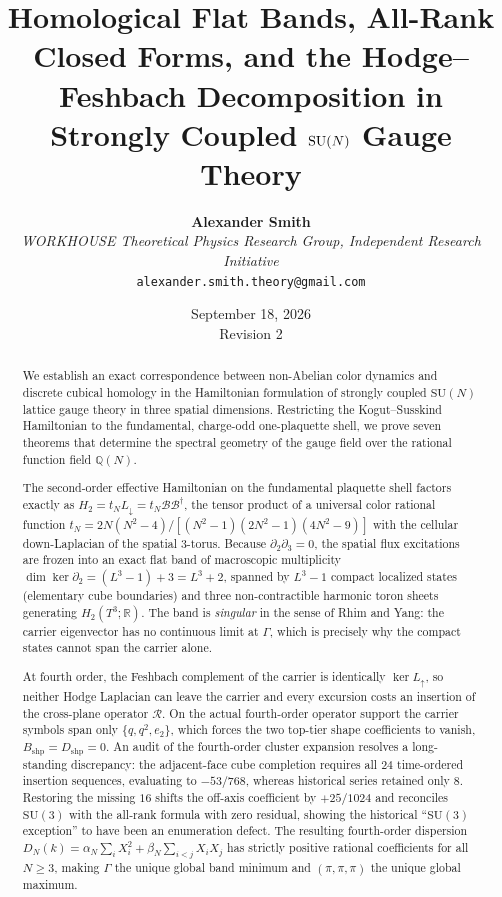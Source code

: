 \documentclass[11pt,a4paper]{article}
\title{\textbf{Homological Flat Bands, All-Rank Closed Forms, and the Hodge--Feshbach Decomposition in Strongly Coupled $\SU(N)$ Gauge Theory}}
\author{\textbf{Alexander Smith}\\[0.5em]
\small \textit{WORKHOUSE Theoretical Physics Research Group, Independent Research Initiative}\\[0.2em]
\small \texttt{alexander.smith.theory@gmail.com}}
\date{September 18, 2026\\[0.3em]\small Revision 2}
\theoremstyle{definition}
\newcommand{\Q}{\mathbb{Q}}
\newcommand{\R}{\mathbb{R}}
\newcommand{\Ldn}{L_{\downarrow}}
\newcommand{\Lup}{L_{\uparrow}}
\newcommand{\dg}{^{\dagger}}
\newcommand{\SU}{\mathrm{SU}}
\newcommand{\Bc}{\mathcal{B}}          %
\newcommand{\Rc}{\mathcal{R}}          %
\newcommand{\Bshp}{B_{\mathrm{shp}}}
\newcommand{\Dshp}{D_{\mathrm{shp}}}
\begin{document}
\maketitle

\begin{abstract}
\noindent
We establish an exact correspondence between non-Abelian color dynamics and discrete cubical homology in the Hamiltonian formulation of strongly coupled $\SU(N)$ lattice gauge theory in three spatial dimensions. Restricting the Kogut--Susskind Hamiltonian to the fundamental, charge-odd one-plaquette shell, we prove seven theorems that determine the spectral geometry of the gauge field over the rational function field $\Q(N)$.

The second-order effective Hamiltonian on the fundamental plaquette shell factors exactly as $H_2 = t_N \Ldn = t_N \Bc\Bc\dg$, the tensor product of a universal color rational function $t_N = 2N(N^2-4)/[(N^2-1)(2N^2-1)(4N^2-9)]$ with the cellular down-Laplacian of the spatial 3-torus. Because $\partial_2\partial_3 = 0$, the spatial flux excitations are frozen into an exact flat band of macroscopic multiplicity $\dim\ker\partial_2 = (L^3-1)+3 = L^3+2$, spanned by $L^3-1$ compact localized states (elementary cube boundaries) and three non-contractible harmonic toron sheets generating $H_2(T^3;\R)$. The band is \emph{singular} in the sense of Rhim and Yang: the carrier eigenvector has no continuous limit at $\Gamma$, which is precisely why the compact states cannot span the carrier alone.

At fourth order, the Feshbach complement of the carrier is identically $\ker\Lup$, so neither Hodge Laplacian can leave the carrier and every excursion costs an insertion of the cross-plane operator $\Rc$. On the actual fourth-order operator support the carrier symbols span only $\{q,q^2,e_2\}$, which forces the two top-tier shape coefficients to vanish, $\Bshp = \Dshp = 0$. An audit of the fourth-order cluster expansion resolves a long-standing discrepancy: the adjacent-face cube completion requires all $24$ time-ordered insertion sequences, evaluating to $-53/768$, whereas historical series retained only $8$. Restoring the missing $16$ shifts the off-axis coefficient by $+25/1024$ and reconciles $\SU(3)$ with the all-rank formula with zero residual, showing the historical ``$\SU(3)$ exception'' to have been an enumeration defect. The resulting fourth-order dispersion $D_N(k) = \alpha_N\sum_i X_i^2 + \beta_N\sum_{i<j}X_iX_j$ has strictly positive rational coefficients for all $N\ge 3$, making $\Gamma$ the unique global band minimum and $(\pi,\pi,\pi)$ the unique global maximum.


\end{abstract}
\end{document}

